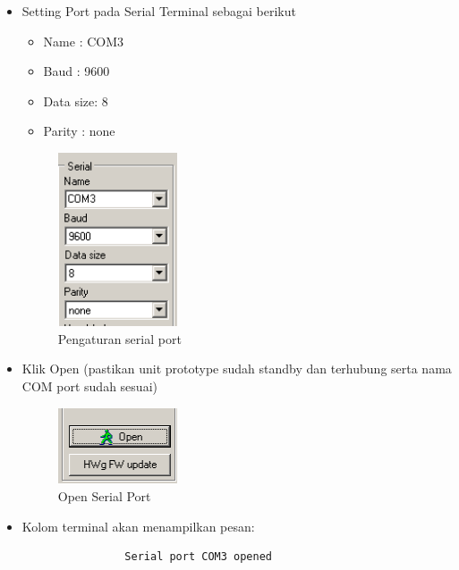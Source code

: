 \documentclass{article}
\begin{document}
\begin{enumerate}
\begin{itemize}
			\item Setting Port pada Serial Terminal sebagai berikut
			\begin{itemize}
				\item Name     : COM3
				\item Baud     : 9600
				\item Data size: 8
				\item Parity   : none
			\end{itemize}
			
			\begin{figure}[H]
				\centering
				\includegraphics[width=100pt]{images/software/hercules_port}
				\caption{Pengaturan serial port}
			\end{figure}
			
			\item Klik Open (pastikan unit prototype sudah standby dan terhubung
			serta nama COM port sudah sesuai)
			
			\begin{figure}[H]
				\centering
				\includegraphics[width=100pt]{images/software/hercules_open}
				\caption{Open Serial Port}
			\end{figure}
			
			\item Kolom terminal akan menampilkan pesan:
			\begin{verbatim}
				Serial port COM3 opened
			\end{verbatim}
			

\end{itemize}
\end{enumerate}
\end{document}

